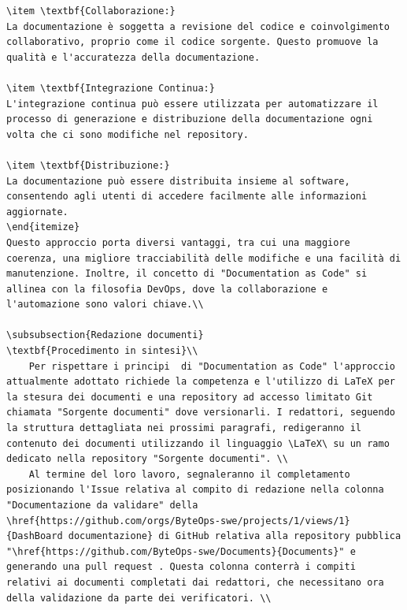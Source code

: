 \documentclass{article}
\begin{document}
\begin{enumerate}
\begin{lstlisting}[style=code]
\item \textbf{Collaborazione:}
La documentazione è soggetta a revisione del codice e coinvolgimento collaborativo, proprio come il codice sorgente. Questo promuove la qualità e l'accuratezza della documentazione.

\item \textbf{Integrazione Continua:}
L'integrazione continua può essere utilizzata per automatizzare il processo di generazione e distribuzione della documentazione ogni volta che ci sono modifiche nel repository.

\item \textbf{Distribuzione:}
La documentazione può essere distribuita insieme al software, consentendo agli utenti di accedere facilmente alle informazioni aggiornate.
\end{itemize}
Questo approccio porta diversi vantaggi, tra cui una maggiore coerenza, una migliore tracciabilità delle modifiche e una facilità di manutenzione. Inoltre, il concetto di "Documentation as Code" si allinea con la filosofia DevOps, dove la collaborazione e l'automazione sono valori chiave.\\

\subsubsection{Redazione documenti}
\textbf{Procedimento in sintesi}\\
    Per rispettare i principi  di "Documentation as Code" l'approccio attualmente adottato richiede la competenza e l'utilizzo di LaTeX per la stesura dei documenti e una repository ad accesso limitato Git chiamata "Sorgente documenti" dove versionarli. I redattori, seguendo la struttura dettagliata nei prossimi paragrafi, redigeranno il contenuto dei documenti utilizzando il linguaggio \LaTeX\ su un ramo dedicato nella repository "Sorgente documenti". \\
    Al termine del loro lavoro, segnaleranno il completamento posizionando l'Issue relativa al compito di redazione nella colonna "Documentazione da validare" della \href{https://github.com/orgs/ByteOps-swe/projects/1/views/1}{DashBoard documentazione} di GitHub relativa alla repository pubblica "\href{https://github.com/ByteOps-swe/Documents}{Documents}" e generando una pull request . Questa colonna conterrà i compiti relativi ai documenti completati dai redattori, che necessitano ora della validazione da parte dei verificatori. \\
   

\end{lstlisting}
\end{enumerate}
\end{document}
